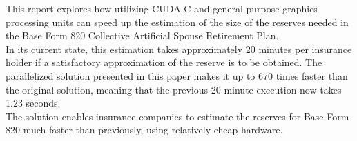 


This report explores how utilizing CUDA C and general purpose graphics processing units can speed up the estimation of the size of the reserves needed in the Base Form 820 Collective Artificial Spouse Retirement Plan.\\

In its current state, this estimation takes approximately 20 minutes per insurance holder if a satisfactory approximation of the reserve is to be obtained. The parallelized solution presented in this paper makes it up to 670 times faster than the original solution, meaning that the previous 20 minute execution now takes 1.23 seconds. \\

The solution enables insurance companies to estimate the reserves for Base Form 820 much faster than previously, using relatively cheap hardware.
